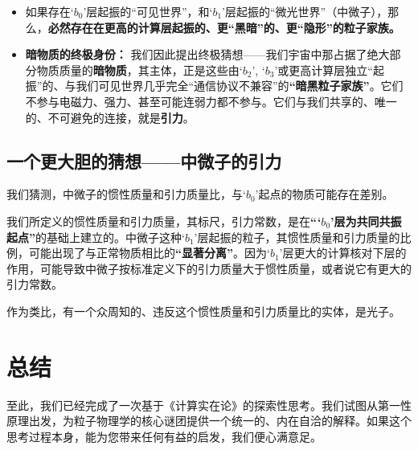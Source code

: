 \documentclass[12pt]{article}
\begin{document}
\begin{itemize}
    \item 如果存在`$b_0$'层起振的``可见世界''，和`$b_1$'层起振的``微光世界''（中微子），那么，\textbf{必然存在在更高的计算层起振的、更``黑暗''的、更``隐形''的粒子家族。}

    \item \textbf{暗物质的终极身份：} 我们因此提出终极猜想——我们宇宙中那占据了绝大部分物质质量的\textbf{暗物质}，其主体，正是这些由`$b_2$', `$b_3$'或更高计算层独立``起振''的、与我们可见世界几乎完全``通信协议不兼容''的\textbf{``暗黑粒子家族''}。它们不参与电磁力、强力、甚至可能连弱力都不参与。它们与我们共享的、唯一的、不可避免的连接，就是\textbf{引力}。
\end{itemize}

\subsection{一个更大胆的猜想——中微子的引力}
我们猜测，中微子的惯性质量和引力质量比，与`$b_0$'起点的物质可能存在差别。

我们所定义的惯性质量和引力质量，其标尺，引力常数，是在\textbf{“`$b_0$'层为共同共振起点”}的基础上建立的。中微子这种`$b_1$'层起振的粒子，其惯性质量和引力质量的比例，可能出现了与正常物质相比的\textbf{``显著分离''}。因为`$b_1$'层更大的计算核对下层的作用，可能导致中微子按标准定义下的引力质量大于惯性质量，或者说它有更大的引力常数。

作为类比，有一个众周知的、违反这个惯性质量和引力质量比的实体，是光子。

\section*{总结}
至此，我们已经完成了一次基于《计算实在论》的探索性思考。我们试图从第一性原理出发，为粒子物理学的核心谜团提供一个统一的、内在自洽的解释。如果这个思考过程本身，能为您带来任何有益的启发，我们便心满意足。
\end{document}
